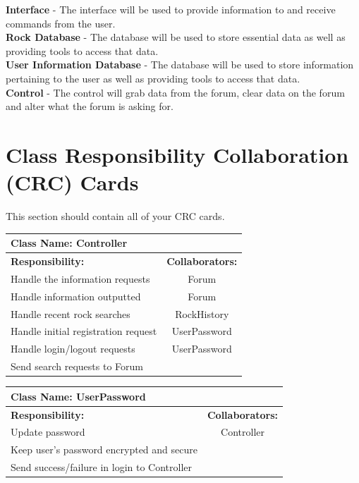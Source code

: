 \documentclass[titlepage]{article}
\begin{document}
\textbf{Interface} - The interface will be used to provide information to and receive commands from the user. \\

\textbf{Rock Database} - The database will be used to store essential data as well as providing tools to access that data.\\

\textbf{User Information Database} - The database will be used to store information pertaining to the user as well as providing tools to access that data.\\

\textbf{Control} - The control will grab data from the forum, clear data on the forum and alter what the forum is asking for.


\newpage
\section{Class Responsibility Collaboration (CRC) Cards}
This section should contain all of your CRC cards.

\begin{table}[!ht]
	\centering
	\begin{tabular}{| p{8cm} | c |} \hline
		\multicolumn{2}{|l|}{\textbf{Class Name: Controller}} \\ \hline
		\textbf{Responsibility:} & \textbf{Collaborators:} \\ \hline
		Handle the information requests & Forum\\ \hline
		Handle information outputted & Forum\\ \hline
		Handle recent rock searches & RockHistory\\ \hline
		Handle initial registration request & UserPassword\\ \hline
		Handle login/logout requests & UserPassword\\ \hline
		Send search requests to Forum & \\ \hline 		
	\end{tabular}
\end{table}

\begin{table}[!ht]
	\centering
	\begin{tabular}{| p{8cm} | c |} \hline
		\multicolumn{2}{|l|}{\textbf{Class Name: UserPassword}} \\ \hline
		\textbf{Responsibility:} & \textbf{Collaborators:} \\ \hline
		Update password & Controller\\ \hline
		Keep user's password encrypted and secure & \\ \hline
		Send success/failure in login to Controller & \\ \hline						
	\end{tabular}
\end{table}
\end{document}
